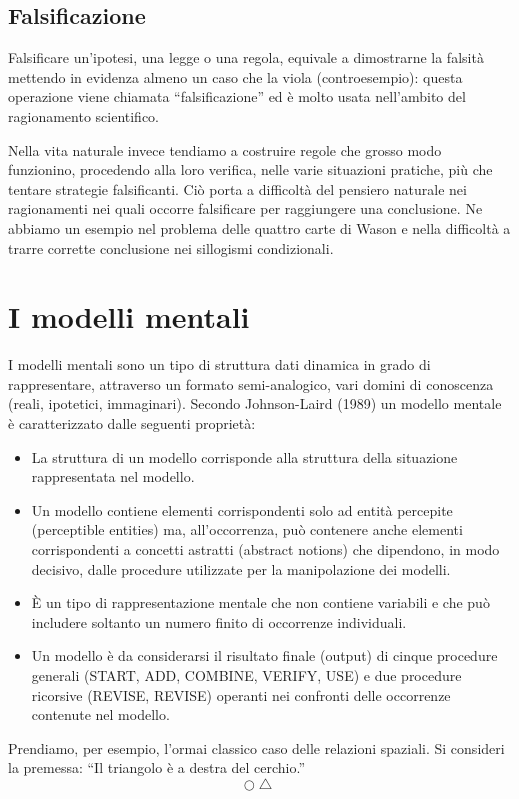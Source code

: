 \subsection{Falsificazione}
Falsificare un’ipotesi, una legge o una regola, equivale a dimostrarne la falsità mettendo in evidenza almeno un caso che la viola (controesempio): questa operazione viene chiamata “falsificazione” ed è molto usata nell’ambito del ragionamento scientifico.

Nella vita naturale invece tendiamo a costruire regole che grosso modo funzionino, procedendo alla loro verifica, nelle varie situazioni pratiche, più che tentare strategie falsificanti. Ciò porta a difficoltà del pensiero naturale nei ragionamenti nei quali occorre falsificare per raggiungere una conclusione. Ne abbiamo un esempio nel problema delle quattro carte di Wason e nella difficoltà a trarre corrette conclusione nei sillogismi condizionali.

\section{I modelli mentali}
I modelli mentali sono un tipo di struttura dati dinamica in grado di rappresentare, attraverso un formato semi-analogico, vari domini di conoscenza (reali, ipotetici, immaginari). Secondo Johnson-Laird (1989) un modello mentale è caratterizzato dalle seguenti proprietà:

\begin{itemize}
  \item La struttura di un modello corrisponde alla struttura della situazione rappresentata nel modello.
  \item Un modello contiene elementi corrispondenti solo ad entità percepite (perceptible entities) ma, all’occorrenza, può contenere anche elementi corrispondenti a concetti astratti (abstract notions) che dipendono, in modo decisivo, dalle procedure utilizzate per la manipolazione dei modelli. 
  \item È un tipo di rappresentazione mentale che non contiene variabili e che può includere soltanto un numero finito di occorrenze individuali.
  \item Un modello è da considerarsi il risultato finale (output) di cinque procedure generali (START, ADD, COMBINE, VERIFY, USE) e due procedure ricorsive (REVISE, REVISE) operanti nei confronti delle occorrenze contenute nel modello.
\end{itemize}

Prendiamo, per esempio, l’ormai classico caso delle relazioni spaziali. Si consideri la premessa: “Il triangolo è a destra del cerchio.”
\[\bigcirc \bigtriangleup\]

